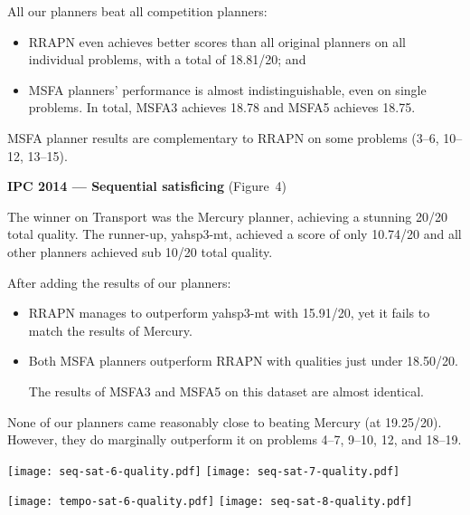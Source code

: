 \documentclass[a1paper,landscape,fontscale=0.45]{baposter} %
\begin{document}
\begin{poster}
{\begin{multicols}{2}
{All our planners beat all competition planners:
\begin{itemize}
\item RRAPN even achieves better scores than all original planners on all individual problems, with a total of 18.81/20; and
\item MSFA planners' performance
is almost indistinguishable, even on single problems. In total, MSFA3 achieves 18.78 and MSFA5 achieves 18.75.
\end{itemize}
MSFA planner results are complementary to RRAPN on some problems (3--6, 10--12, 13--15).


\vspace{0.15cm}
\textbf{IPC 2014 --- Sequential satisficing} (Figure~4)
\vspace{0.15cm}

The winner on Transport was the Mercury planner, achieving
a stunning 20/20 total quality. The runner-up, yahsp3-mt, achieved a score of only 10.74/20
and all other planners achieved sub 10/20 total quality.

After adding the results of our planners:
\begin{itemize}
\item RRAPN manages to outperform yahsp3-mt with 15.91/20, yet it fails
to match the results of Mercury.
\item Both MSFA planners outperform RRAPN with qualities just under 18.50/20.

The results of MSFA3 and MSFA5 on this dataset are almost identical.
\end{itemize}
None of our planners came reasonably close to beating Mercury (at 19.25/20).
However, they do marginally outperform it on problems 4--7, 9--10, 12, and 18--19.
}
\end{multicols}

\vspace{0.2em}
\begin{multicols}{2}
\begin{center}
\texttt{[image: seq-sat-6-quality.pdf]}
\texttt{[image: seq-sat-7-quality.pdf]}
\end{center}
\begin{center}
\texttt{[image: tempo-sat-6-quality.pdf]}
\texttt{[image: seq-sat-8-quality.pdf]}
\end{center}
\end{multicols}
}





\end{poster}
\end{document}
